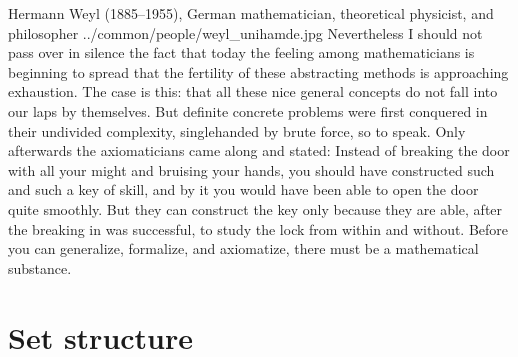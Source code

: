 \qboxnpq
  {Hermann Weyl (1885--1955), German mathematician, theoretical physicist, and philosopher \footnotemark}
  {../common/people/weyl_unihamde.jpg}
  {Nevertheless I should not pass over in silence the fact that today the feeling among mathematicians is beginning to spread 
   that the fertility of these abstracting methods is approaching exhaustion. 
   The case is this: that all these nice general concepts do not fall into our laps by themselves. 
   But definite concrete problems were first conquered in their undivided complexity, singlehanded by brute force, so to speak. 
   Only afterwards the axiomaticians came along and stated: 
   Instead of breaking the door with all your might and bruising your hands, 
   you should have constructed such and such a key of skill, and by it you would have been able to open the door quite smoothly. 
   But they can construct the key only because they are able, after the breaking in was successful, 
   to study the lock from within and without. 
   Before you can generalize, formalize, and axiomatize, there must be a mathematical substance.}

\section{Set structure}
%


